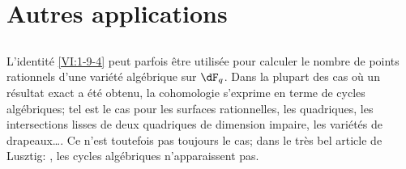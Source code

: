 \section{Autres applications}\label{VI:8}





\subsection{}\label{VI:8-1}

L'identité \ref{VI:1-9-4} peut parfois être utilisée pour calculer 
le nombre de points rationnels d'une variété algébrique sur $\dF_q$. Dans 
la plupart des cas où un résultat exact a été obtenu, la cohomologie 
s'exprime en terme de cycles algébriques; tel est le cas pour les surfaces 
rationnelles, les quadriques, les intersections lisses de deux quadriques de 
dimension impaire, les variétés de drapeaux\ldots. Ce n'est toutefois pas 
toujours le cas; dans le très bel article de Lusztig: , les cycles 
algébriques n'apparaissent pas. 





\subsection{}\label{VI:8-2}

